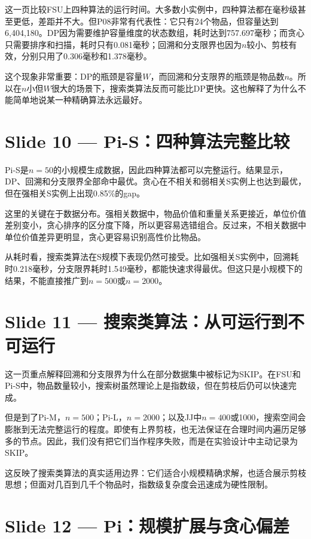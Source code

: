 \documentclass[12pt,a4paper]{ctexart}
\begin{document}
这一页比较FSU上四种算法的运行时间。大多数小实例中，四种算法都在毫秒级甚至更低，差距并不大。但P08非常有代表性：它只有24个物品，但容量达到6,404,180。DP因为需要维护容量维度的状态数组，耗时达到757.697毫秒；而贪心只需要排序和扫描，耗时只有0.081毫秒；回溯和分支限界也因为$n$较小、剪枝有效，分别只用了0.306毫秒和1.378毫秒。

这个现象非常重要：DP的瓶颈是容量$W$，而回溯和分支限界的瓶颈是物品数$n$。所以在$n$小但$W$很大的场景下，搜索类算法反而可能比DP更快。这也解释了为什么不能简单地说某一种精确算法永远最好。

\section*{Slide 10 — Pi-S：四种算法完整比较}

Pi-S是$n=50$的小规模生成数据，因此四种算法都可以完整运行。结果显示，DP、回溯和分支限界全部命中最优。贪心在不相关和弱相关S实例上也达到最优，但在强相关S实例上出现0.85\%的gap。

这里的关键在于数据分布。强相关数据中，物品价值和重量关系更接近，单位价值差别变小，贪心排序的区分度下降，所以更容易选错组合。反过来，不相关数据中单位价值差异更明显，贪心更容易识别高性价比物品。

从耗时看，搜索类算法在S规模下表现仍然可接受。比如强相关S实例中，回溯耗时0.218毫秒，分支限界耗时1.549毫秒，都能快速求得最优。但这只是小规模下的结果，不能直接推广到$n=500$或$n=2000$。

\section*{Slide 11 — 搜索类算法：从可运行到不可运行}

这一页重点解释回溯和分支限界为什么在部分数据集中被标记为SKIP。在FSU和Pi-S中，物品数量较小，搜索树虽然理论上是指数级，但在剪枝后仍可以快速完成。

但是到了Pi-M，$n=500$；Pi-L，$n=2000$；以及JJ中$n=400$或1000，搜索空间会膨胀到无法完整运行的程度。即使有上界剪枝，也无法保证在合理时间内遍历足够多的节点。因此，我们没有把它们当作程序失败，而是在实验设计中主动记录为SKIP。

这反映了搜索类算法的真实适用边界：它们适合小规模精确求解，也适合展示剪枝思想；但面对几百到几千个物品时，指数级复杂度会迅速成为硬性限制。

\section*{Slide 12 — Pi：规模扩展与贪心偏差}
\end{document}

